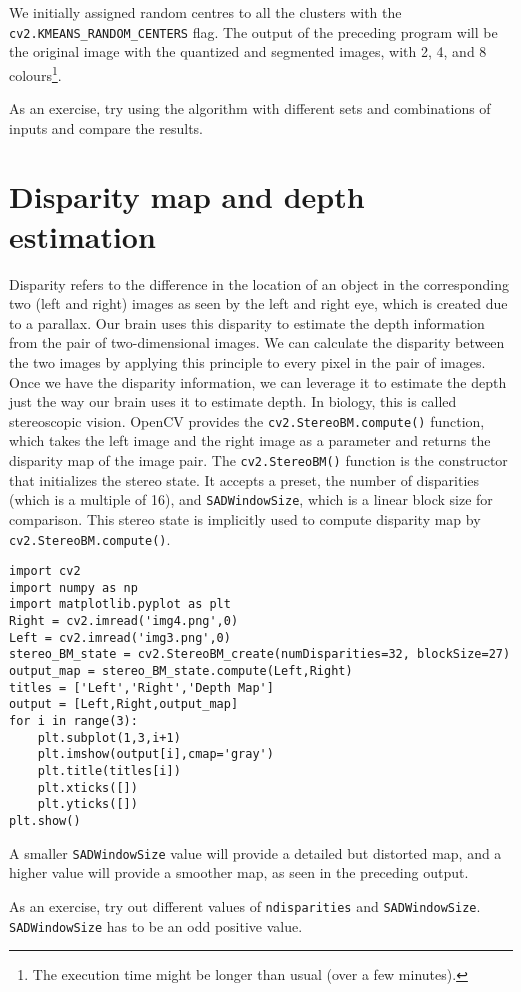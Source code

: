\documentclass{labo}
\begin{document}
We initially assigned random centres to all the clusters with the \texttt{cv2.KMEANS\_RANDOM\_CENTERS} flag. The output of the preceding program will be the original image with the quantized and segmented images, with 2, 4, and 8 colours\footnote{The execution time might be longer than usual (over a few minutes).}. 
\begin{leftbar}
As an exercise, try using the algorithm with different sets and combinations of inputs and compare the results.
\end{leftbar}

\section*{Disparity map and depth estimation}
Disparity refers to the difference in the location of an object in the corresponding two (left and right) images as seen by the left and right eye, which is created due to a parallax. Our brain uses this disparity to estimate the depth information from the pair of two-dimensional images. We can calculate the disparity between the two images by applying this principle to every pixel in the pair of images. Once we have the disparity information, we can leverage it to estimate the depth just the way our brain uses it to estimate depth. In biology, this is called stereoscopic vision. OpenCV provides the \texttt{cv2.StereoBM.compute()} function, which takes the left image and the right image as a parameter and returns the disparity map of the image pair. The \texttt{cv2.StereoBM()} function is the constructor that initializes the stereo state. It accepts a preset, the number of disparities (which is a multiple of 16), and \texttt{SADWindowSize}, which is a linear block size for comparison. This stereo state is implicitly used to compute disparity map by \texttt{cv2.StereoBM.compute()}.

\begin{verbatim}
import cv2 
import numpy as np 
import matplotlib.pyplot as plt 
Right = cv2.imread('img4.png',0) 
Left = cv2.imread('img3.png',0) 
stereo_BM_state = cv2.StereoBM_create(numDisparities=32, blockSize=27)
output_map = stereo_BM_state.compute(Left,Right) 
titles = ['Left','Right','Depth Map'] 
output = [Left,Right,output_map] 
for i in range(3): 
	plt.subplot(1,3,i+1)
	plt.imshow(output[i],cmap='gray') 
	plt.title(titles[i]) 
	plt.xticks([])
	plt.yticks([]) 
plt.show()
\end{verbatim}

A smaller \texttt{SADWindowSize} value will provide a detailed but distorted map, and a higher value will provide a smoother map, as seen in the preceding output. 
\begin{leftbar}
As an exercise, try out different values of \texttt{ndisparities} and \texttt{SADWindowSize}. \texttt{SADWindowSize} has to be an odd positive value. 
\end{leftbar}
\end{document}
